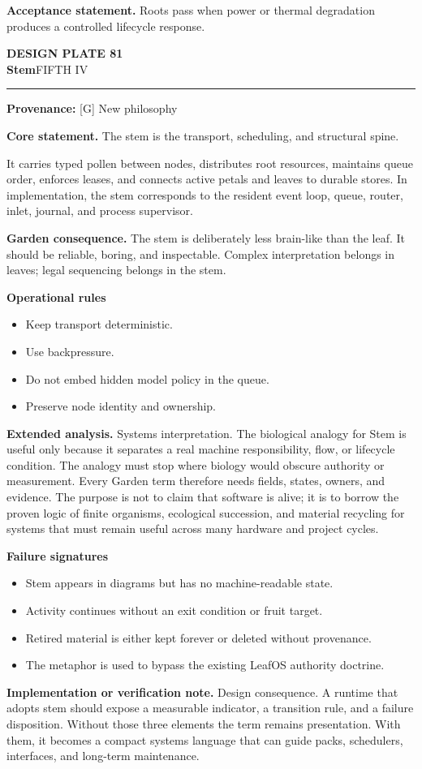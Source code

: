 \documentclass[10pt,letterpaper,oneside]{article}
\newcommand{\prov}[1]{\textcolor{gardenBlue}{\sffamily\footnotesize\textbf{Provenance:} #1}}
\newcommand{\platetitle}[3]{%
  \begin{minipage}[t][0.54in][t]{\textwidth}
  {\sffamily\bfseries\color{gardenDeep}\fontsize{9}{10}\selectfont DESIGN PLATE #1}\\[-1pt]
  {\sffamily\bfseries\color{gardenInk}\fontsize{16.5}{18}\selectfont #2}\hfill{\sffamily\color{gardenGreen}\large #3}
  \end{minipage}\vspace{-2pt}\hrule\vspace{5pt}}
\begin{document}
\begin{acceptbox}
\textbf{Acceptance statement.} Roots pass when power or thermal degradation produces a controlled lifecycle response.
\end{acceptbox}
\newpage
\platetitle{81}{Stem}{FIFTH IV}
\prov{[G] New philosophy}
\fontsize{8.85}{10.45}\selectfont
\begin{corebox}
\textbf{Core statement.} The stem is the transport, scheduling, and structural spine.
\end{corebox}
It carries typed pollen between nodes, distributes root resources, maintains queue order, enforces leases, and connects active petals and leaves to durable stores. In implementation, the stem corresponds to the resident event loop, queue, router, inlet, journal, and process supervisor.

\textbf{Garden consequence.} The stem is deliberately less brain-like than the leaf. It should be reliable, boring, and inspectable. Complex interpretation belongs in leaves; legal sequencing belongs in the stem.

\textbf{Operational rules}
\begin{itemize}
\item Keep transport deterministic.
\item Use backpressure.
\item Do not embed hidden model policy in the queue.
\item Preserve node identity and ownership.
\end{itemize}
\textbf{Extended analysis.} Systems interpretation. The biological analogy for Stem is useful only because it separates a real machine responsibility, flow, or lifecycle condition. The analogy must stop where biology would obscure authority or measurement. Every Garden term therefore needs fields, states, owners, and evidence. The purpose is not to claim that software is alive; it is to borrow the proven logic of finite organisms, ecological succession, and material recycling for systems that must remain useful across many hardware and project cycles.

\textbf{Failure signatures}
\begin{itemize}
\item Stem appears in diagrams but has no machine-readable state.
\item Activity continues without an exit condition or fruit target.
\item Retired material is either kept forever or deleted without provenance.
\item The metaphor is used to bypass the existing LeafOS authority doctrine.
\end{itemize}
\textbf{Implementation or verification note.} Design consequence. A runtime that adopts stem should expose a measurable indicator, a transition rule, and a failure disposition. Without those three elements the term remains presentation. With them, it becomes a compact systems language that can guide packs, schedulers, interfaces, and long-term maintenance.
\end{document}

